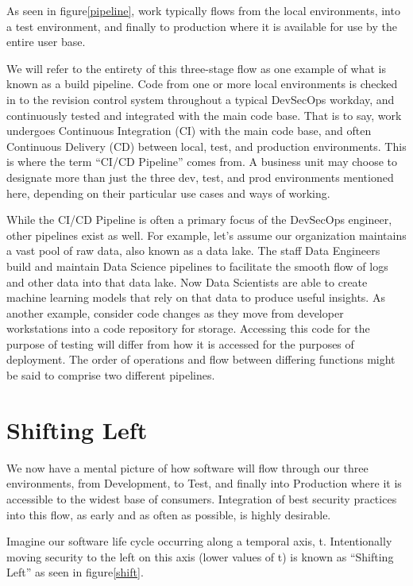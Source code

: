 \justify{}
As seen in figure\ref{pipeline}, work typically flows from the local environments, into a test
environment, and finally to production where it is available for use by the entire user base.

\justify{}
We will refer to the entirety of this three-stage flow as one example of what is known as a build pipeline.
Code from one or more local environments is checked in to the revision control system throughout a
typical DevSecOps workday, and continuously tested and integrated with the main code base. That is to say, work undergoes
Continuous Integration (CI) with the main code base,
and often Continuous Delivery (CD) between local, test, and production environments. This is
where the term ``CI/CD Pipeline'' comes from. A business unit may choose to designate more than just the three dev, test,
and prod environments mentioned here, depending on their particular use cases and ways of working.

\justify{}
While the CI/CD Pipeline is often a primary focus of the DevSecOps engineer, other pipelines exist as well. For example,
let's assume our organization maintains a vast pool of raw data, also known as a data lake. The staff Data
Engineers build and maintain Data Science pipelines to facilitate the smooth flow
of logs and other data into that data lake. Now Data Scientists are able to create machine learning models that rely on that
data to produce useful insights. As another example, consider code changes as they move from
developer workstations into a code repository for storage. Accessing this code for the purpose of testing will differ from
how it is accessed for the purposes of deployment. The order of operations and flow
between differing functions might be said to comprise two different pipelines.

\section{Shifting Left}

\justify{}
We now have a mental picture of how software will flow through our three environments, from
Development, to Test, and finally into Production where it is accessible to the widest
base of consumers. Integration of best security practices into this flow, as early and as often
as possible, is highly desirable.

\justify{}
Imagine our software life cycle occurring along a temporal axis, t. Intentionally moving security to the
left on this axis (lower values of t) is known as ``Shifting Left'' as seen
in figure\ref{shift}.


